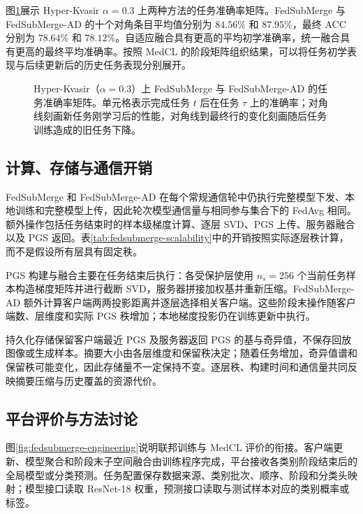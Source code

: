 图\ref{fig:fedsubmerge-accuracy-matrix}展示 Hyper-Kvasir $\alpha=0.3$ 上两种方法的任务准确率矩阵。FedSubMerge 与 FedSubMerge-AD 的十个对角条目平均值分别为 $84.56\%$ 和 $87.95\%$，最终 ACC 分别为 $78.64\%$ 和 $78.12\%$。自适应融合具有更高的平均初学准确率，统一融合具有更高的最终平均准确率。按照 MedCL 的阶段矩阵组织结果，可以将任务初学表现与后续更新后的历史任务表现分别展开。

\begin{figure}[htbp]
\centering
{}
\caption{Hyper-Kvasir（$\alpha=0.3$）上 FedSubMerge 与 FedSubMerge-AD 的任务准确率矩阵。单元格表示完成任务 $t$ 后在任务 $\tau$ 上的准确率；对角线刻画新任务刚学习后的性能，对角线到最终行的变化刻画随后任务训练造成的旧任务下降。}
\label{fig:fedsubmerge-accuracy-matrix}
\end{figure}

\subsection{计算、存储与通信开销}
\label{subsec:fedsubmerge-efficiency}

FedSubMerge 和 FedSubMerge-AD 在每个常规通信轮中仍执行完整模型下发、本地训练和完整模型上传，因此轮次模型通信量与相同参与集合下的 FedAvg 相同。额外操作包括任务结束时的样本级梯度计算、逐层 SVD、PGS 上传、服务器融合以及 PGS 返回。表\ref{tab:fedsubmerge-scalability}中的开销按照实际逐层秩计算，而不是假设所有层具有固定秩。

PGS 构建与融合主要在任务结束后执行：各受保护层使用 $n_s=256$ 个当前任务样本构造梯度矩阵并进行截断 SVD，服务器拼接加权基并重新压缩。FedSubMerge-AD 额外计算客户端两两投影距离并逐层选择相关客户端。这些阶段末操作随客户端数、层维度和实际 PGS 秩增加；本地梯度投影仍在训练更新中执行。

持久化存储保留客户端最近 PGS 及服务器返回 PGS 的基与奇异值，不保存回放图像或生成样本。摘要大小由各层维度和保留秩决定；随着任务增加，奇异值谱和保留秩可能变化，因此存储量不一定保持不变。逐层秩、构建时间和通信量共同反映摘要压缩与历史覆盖的资源代价。

\subsection{平台评价与方法讨论}
\label{sec:fedsubmerge-discussion}
\label{sec:fedsubmerge-engineering}
\label{sec:fedsubmerge-platform-integration}

图\ref{fig:fedsubmerge-engineering}说明联邦训练与 MedCL 评价的衔接。客户端更新、模型聚合和阶段末子空间融合由训练程序完成，平台接收各类别阶段结束后的全局模型或分类预测。任务配置保存数据来源、类别批次、顺序、阶段和分类头映射；模型接口读取 ResNet-18 权重，预测接口读取与测试样本对应的类别概率或标签。

